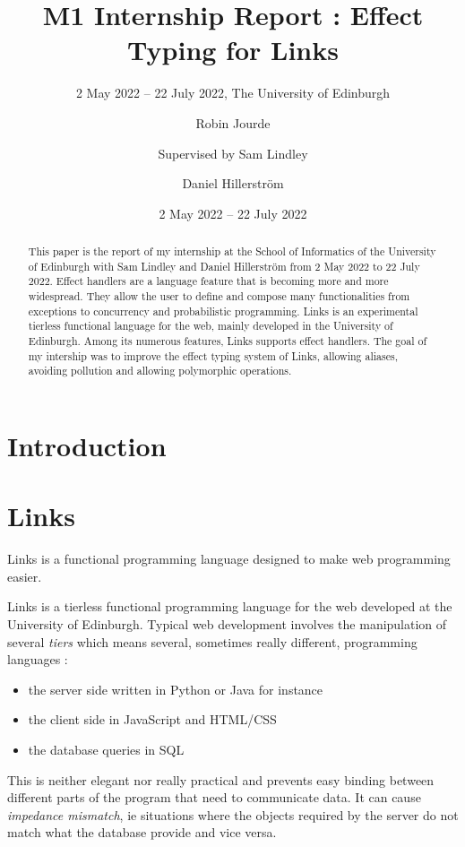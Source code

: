 \documentclass[nonacm=true, language=french, language=english]{acmart}
\author[R. Jourde]{Robin Jourde}
\affiliation{%
  \institution{École Normale Supérieure de Lyon}%
  \country{France}%
}
\author{Supervised by Sam Lindley}
\author{Daniel Hillerström}
\affiliation{%
  \institution{The University of Edinburgh}%
  \country{United Kingdom}%
}
\title[M1 Intership Report]{M1 Internship Report : Effect Typing for Links}
\subtitle{2 May 2022 -- 22 July 2022, The University of Edinburgh}
\date{2 May 2022 -- 22 July 2022}
\begin{document}
\begin{abstract}
  This paper is the report of my internship at the School of Informatics of the University of Edinburgh with Sam Lindley and Daniel Hillerström from 2 May 2022 to 22 July 2022.
  Effect handlers are a language feature that is becoming more and more widespread. They allow the user to define and compose many functionalities from exceptions to concurrency and probabilistic programming.
  Links is an experimental tierless functional language for the web, mainly developed in the University of Edinburgh. Among its numerous features, Links supports effect handlers.
  The goal of my intership was to improve the effect typing system of Links, allowing aliases, avoiding pollution and allowing polymorphic operations.
\end{abstract}


\maketitle

\tableofcontents


\section{Introduction}

\section{Links}

\begin{fquote}
 Links is a functional programming language designed to make web programming easier.
\end{fquote}

Links \cite{} is a tierless functional programming language for the web developed at the University of Edinburgh. Typical web development involves the manipulation of several \emph{tiers} which means several, sometimes really different, programming languages :
\begin{itemize}
  \item the server side written in Python or Java for instance
  \item the client side in JavaScript and HTML/CSS
  \item the database queries in SQL
\end{itemize}
This is neither elegant nor really practical and prevents easy binding between different parts of the program that need to communicate data. It can cause \emph{impedance mismatch}, ie situations where the objects required by the server do not match what the database provide and vice versa.
\end{document}
